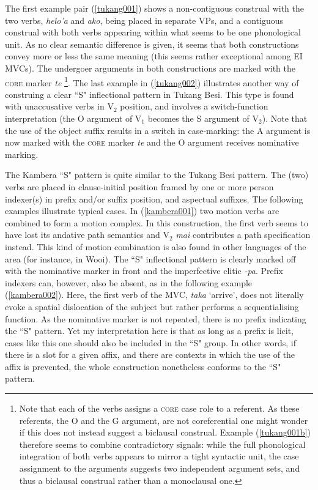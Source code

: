 The first example pair (\ref{tukang001}) shows a non-contiguous construal with the two verbs, \textit{helo'a} and \textit{ako}, being placed in separate VPs, and a contiguous construal with both verbs appearing within what seems to be one phonological unit. As no clear semantic difference is given, it seems that both constructions convey more or less the same meaning (this seems rather exceptional among EI MVCs). The undergoer arguments in both constructions are marked with the \textsc{core} marker \textit{te} \footnote{Note that each of the verbs assigns a \textsc{core} case role to a referent. As these referents, the O and the G argument, are not coreferential one might wonder if this does not instead suggest a biclausal construal. Example (\ref{tukang001b}) therefore seems to combine contradictory signals: while the full phonological integration of both verbs appears to mirror a tight syntactic unit, the case assignment to the arguments suggests two independent argument sets, and thus a biclausal construal rather than a monoclausal one.}. The last example in (\ref{tukang002}) illustrates another way of construing a clear ``S" inflectional pattern in Tukang Besi. This type is found with unaccusative verbs in V$_2$ position, and involves a switch-function interpretation (the O argument of V$_1$ becomes the S argument of V$_2$). Note that the use of the object suffix results in a switch in case-marking: the A argument is now marked with the \textsc{core} marker \textit{te} and the O argument receives nominative marking.

The Kambera ``S" pattern is quite similar to the Tukang Besi pattern. The (two) verbs are placed in clause-initial position framed by one or more person indexer(s) in prefix and/or suffix position, and aspectual suffixes. The following examples illustrate typical cases. In (\ref{kambera001}) two motion verbs are combined to form a motion complex. In this construction, the first verb seems to have lost its andative path semantics and V$_2$ \textit{mai} contributes a path specification instead. This kind of motion combination is also found in other languages of the area (for instance, in Wooi). The ``S" inflectional pattern is clearly marked off with the nominative marker in front and the imperfective clitic \textit{-pa}. Prefix indexers can, however, also be absent, as in the following example (\ref{kambera002}). Here, the first verb of the MVC, \textit{taka} `arrive', does not literally evoke a spatial dislocation of the subject but rather performs a sequentialising function. As the nominative marker is not repeated, there is no prefix indicating the ``S" pattern. Yet my interpretation here is that as long as a prefix is licit, cases like this one should also be included in the ``S" group. In other words, if there is a slot for a given affix, and there are contexts in which the use of the affix is prevented, the whole construction nonetheless conforms to the ``S" pattern.

